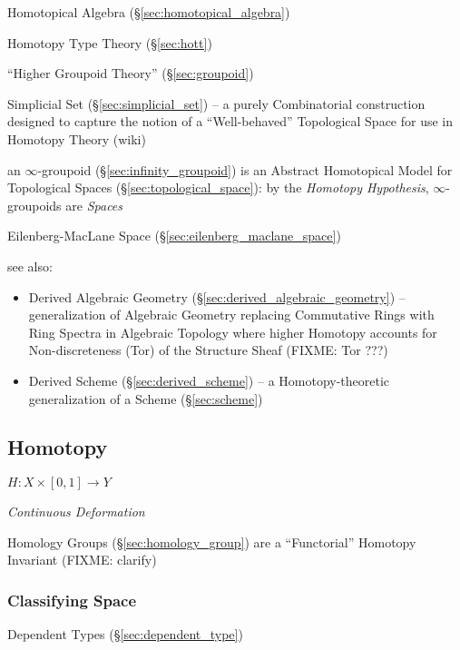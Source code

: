 Homotopical Algebra (\S\ref{sec:homotopical_algebra})

Homotopy Type Theory (\S\ref{sec:hott})

``Higher Groupoid Theory'' (\S\ref{sec:groupoid})

Simplicial Set (\S\ref{sec:simplicial_set}) -- a purely Combinatorial
construction designed to capture the notion of a ``Well-behaved'' Topological
Space for use in Homotopy Theory (wiki)

\fist an $\infty$-groupoid (\S\ref{sec:infinity_groupoid}) is an Abstract
Homotopical Model for Topological Spaces (\S\ref{sec:topological_space}): by the
\emph{Homotopy Hypothesis}, $\infty$-groupoids are \emph{Spaces}

Eilenberg-MacLane Space (\S\ref{sec:eilenberg_maclane_space})

see also:
\begin{itemize}
  \item Derived Algebraic Geometry (\S\ref{sec:derived_algebraic_geometry}) --
    generalization of Algebraic Geometry replacing Commutative Rings with Ring
    Spectra in Algebraic Topology where higher Homotopy accounts for
    Non-discreteness (Tor) of the Structure Sheaf (FIXME: Tor ???)
  \item Derived Scheme (\S\ref{sec:derived_scheme}) -- a Homotopy-theoretic
    generalization of a Scheme (\S\ref{sec:scheme})
\end{itemize}



\subsection{Homotopy}\label{sec:homotopy}

$H : X \times [0,1] \rightarrow Y$

\emph{Continuous Deformation}

Homology Groups (\S\ref{sec:homology_group}) are a ``Functorial'' Homotopy
Invariant (FIXME: clarify)



\subsubsection{Classifying Space}\label{sec:classifying_space}

Dependent Types (\S\ref{sec:dependent_type})

